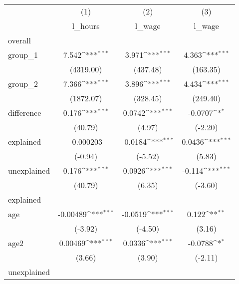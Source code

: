 \begin{table}
    \begin{center}
\def\sym#1{\ifmmode^{#1}\else\(^{#1}\)\fi}
\begin{tabular}{l*{3}{c}}
\hline\hline
            &\multicolumn{1}{c}{(1)}&\multicolumn{1}{c}{(2)}&\multicolumn{1}{c}{(3)}\\
            &\multicolumn{1}{c}{l\_hours}&\multicolumn{1}{c}{l\_wage}&\multicolumn{1}{c}{l\_wage}\\
\hline
overall     &                     &                     &                     \\
group\_1     &       7.542\sym{***}&       3.971\sym{***}&       4.363\sym{***}\\
            &   (4319.00)         &    (437.48)         &    (163.35)         \\
[1em]
group\_2     &       7.366\sym{***}&       3.896\sym{***}&       4.434\sym{***}\\
            &   (1872.07)         &    (328.45)         &    (249.40)         \\
[1em]
difference  &       0.176\sym{***}&      0.0742\sym{***}&     -0.0707\sym{*}  \\
            &     (40.79)         &      (4.97)         &     (-2.20)         \\
[1em]
explained   &   -0.000203         &     -0.0184\sym{***}&      0.0436\sym{***}\\
            &     (-0.94)         &     (-5.52)         &      (5.83)         \\
[1em]
unexplained &       0.176\sym{***}&      0.0926\sym{***}&      -0.114\sym{***}\\
            &     (40.79)         &      (6.35)         &     (-3.60)         \\
\hline
explained   &                     &                     &                     \\
age         &    -0.00489\sym{***}&     -0.0519\sym{***}&       0.122\sym{**} \\
            &     (-3.92)         &     (-4.50)         &      (3.16)         \\
[1em]
age2        &     0.00469\sym{***}&      0.0336\sym{***}&     -0.0788\sym{*}  \\
            &      (3.66)         &      (3.90)         &     (-2.11)         \\
\hline
unexplained &                     &                     &                     \\

\end{tabular}
\end{center}
\end{table}
